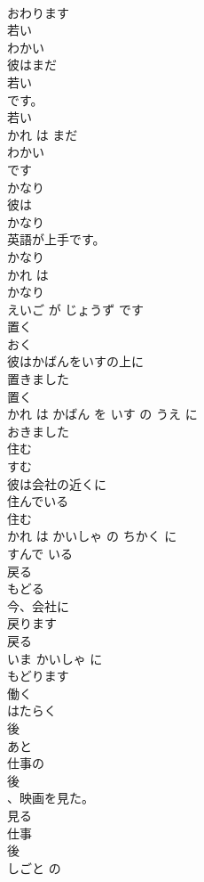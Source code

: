 \documentclass[8pt]{extreport}
\begin{document}
\begin{CJK}{UTF8}{min}
\\	おわります
\\	若い	
\\	わかい	
\\	彼はまだ
\\	若い
\\	です。	
\\	若い 
\\	かれ は まだ 
\\	わかい
\\	です	
\\	かなり	
\\	彼は
\\	かなり
\\	英語が上手です。	
\\	かなり 
\\	かれ は 
\\	かなり
\\	えいご が じょうず です	
\\	置く	
\\	おく	
\\	彼はかばんをいすの上に
\\	置きました
\\	置く 
\\	かれ は かばん を いす の うえ に 
\\	おきました
\\	住む	
\\	すむ	
\\	彼は会社の近くに
\\	住んでいる
\\	住む 
\\	かれ は かいしゃ の ちかく に 
\\	すんで いる
\\	戻る	
\\	もどる	
\\	今、会社に
\\	戻ります
\\	戻る 
\\	いま かいしゃ に 
\\	もどります
\\	働く	
\\	はたらく	
\\	後	
\\	あと	
\\	仕事の
\\	後
\\	、映画を見た。	
\\	見る 
\\	仕事 
\\	後 
\\	しごと の 

\end{CJK}
\end{document}
